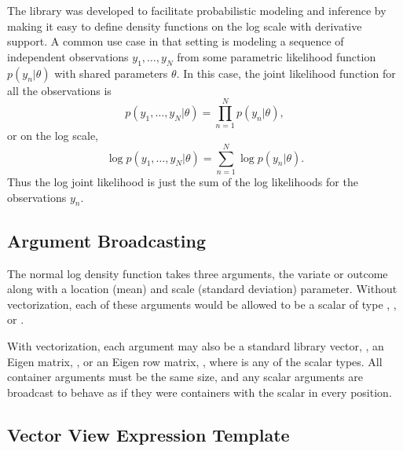 \documentclass[10pt]{article}
\begin{document}
The  library was developed to facilitate
probabilistic modeling and inference by making it easy to define
density functions on the log scale with derivative support.  A common
use case in that setting is modeling a sequence of independent
observations $y_1,\ldots,y_N$ from some parametric likelihood function
$p(y_n|\theta)$ with shared parameters $\theta$.  In this case, the
joint likelihood function for all the observations is
\[
p(y_1,\ldots,y_N|\theta) = \prod_{n=1}^N p(y_n|\theta),
\]
or on the log scale,
\[
\log p(y_1,\ldots,y_N|\theta) = \sum_{n=1}^N \log p(y_n|\theta).
\]
Thus the log joint likelihood is just the sum of the log likelihoods
for the observations $y_n$.

\subsection{Argument Broadcasting}

The normal log density function takes three arguments, the variate or
outcome along with a location (mean) and scale (standard deviation)
parameter.  Without vectorization, each of these arguments would be
allowed to be a scalar of type , , or
.  

With vectorization, each argument may also be a standard library
vector, , an Eigen matrix, ,
or an Eigen row matrix, , where  is
any of the scalar types.  All container arguments must be the same
size, and any scalar arguments are broadcast to behave as if they were
containers with the scalar in every position.

\subsection{Vector View Expression Template}
\end{document}
